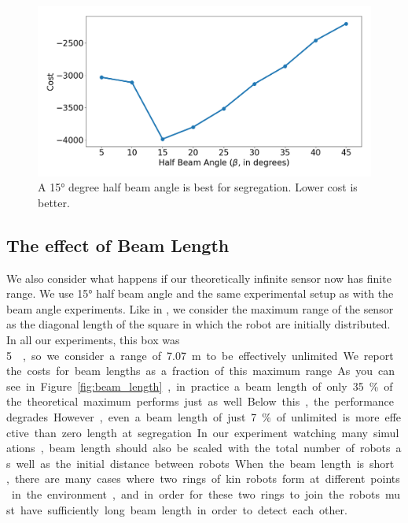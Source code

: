 \documentclass[conference]{IEEEtran}
\begin{document}
    \begin{figure}[H]
      \centering
      \includegraphics[width=1\linewidth]{./images/beam_angle.png}
      \caption{A \ang{15} degree half beam angle is best for segregation. Lower cost is better.}
      \label{fig:beam_angle}
    \end{figure}

  \subsection{The effect of Beam Length} \label{section:beam_length}

    We also consider what happens if our theoretically infinite sensor now has finite range. We use \ang{15} half beam angle and the same experimental setup as with the beam angle experiments. Like in \cite{gauci_self-organized_2014}, we consider the maximum range of the sensor as the diagonal length of the square in which the robot are initially distributed. In all our experiments, this box was \SI{5}{\meter\square}, so we consider a range of \SI{7.07}{\meter} to be effectively unlimited. We report the costs for beam lengths as a fraction of this maximum range. As you can see in Figure \ref{fig:beam_length}, in practice a beam length of only 35\% of the theoretical maximum performs just as well. Below this, the performance degrades. However, even a beam length of just 7\% of unlimited is more effective than zero length at segregation. In our experiment watching many simulations, beam length should also be scaled with the total number of robots as well as the initial distance between robots. When the beam length is short, there are many cases where two rings of kin robots form at different points in the environment, and in order for these two rings to join the robots must have sufficiently long beam length in order to detect each other.
\end{document}
